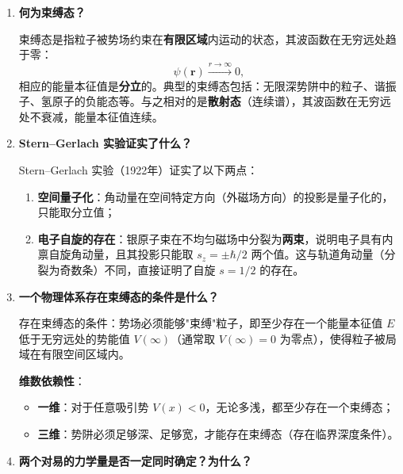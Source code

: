 \begin{enumerate}[label=\textbf{\arabic*.}, leftmargin=2em, itemsep=0.8em]
若以力学量 $\hat{F}$ 的本征函数系 $\{|f_n\rangle\}$ 为基矢（即\textbf{自身表象}），则 $\hat{F}$ 的矩阵表示为\textbf{对角矩阵}，对角元即为其本征值：
\[
    F_{mn} = \langle f_m|\hat{F}|f_n\rangle = f_n\,\delta_{mn}.
\]
这是自身表象的定义性特征，也是表象理论中最简洁的情形。

\item \textbf{何为束缚态？}

束缚态是指粒子被势场约束在\textbf{有限区域}内运动的状态，其波函数在无穷远处趋于零：
\[
    \psi(\mathbf{r}) \xrightarrow{r\to\infty} 0,
\]
相应的能量本征值是\textbf{分立}的。典型的束缚态包括：无限深势阱中的粒子、谐振子、氢原子的负能态等。与之相对的是\textbf{散射态}（连续谱），其波函数在无穷远处不衰减，能量本征值连续。

\item \textbf{Stern--Gerlach 实验证实了什么？}

Stern--Gerlach 实验（1922年）证实了以下两点：
\begin{enumerate}[nosep, label=(\arabic*)]
    \item \textbf{空间量子化}：角动量在空间特定方向（外磁场方向）的投影是量子化的，只能取分立值；
    \item \textbf{电子自旋的存在}：银原子束在不均匀磁场中分裂为\textbf{两束}，说明电子具有内禀自旋角动量，且其投影只能取 $s_z = \pm\hbar/2$ 两个值。这与轨道角动量（分裂为奇数条）不同，直接证明了自旋 $s=1/2$ 的存在。
\end{enumerate}

\item \textbf{一个物理体系存在束缚态的条件是什么？}

存在束缚态的条件：势场必须能够"束缚"粒子，即至少存在一个能量本征值 $E$ 低于无穷远处的势能值 $V(\infty)$（通常取 $V(\infty)=0$ 为零点），使得粒子被局域在有限空间区域内。

\textbf{维数依赖性}：
\begin{itemize}[nosep]
    \item \textbf{一维}：对于任意吸引势 $V(x)<0$，无论多浅，都至少存在一个束缚态；
    \item \textbf{三维}：势阱必须足够深、足够宽，才能存在束缚态（存在临界深度条件）。
\end{itemize}

\item \textbf{两个对易的力学量是否一定同时确定？为什么？}


\end{enumerate}
